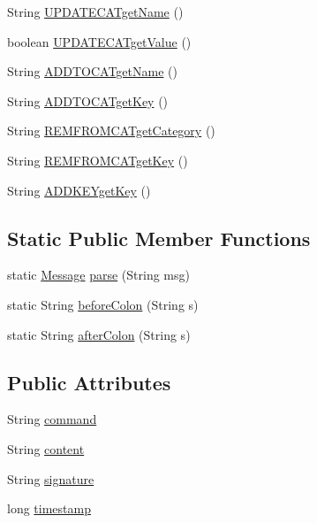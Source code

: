 \begin{DoxyCompactItemize}
\item 
String \hyperlink{classballmerpeak_1_1turtlenet_1_1shared_1_1Message_a4e1c7c11699f6a34f462b9681c77da38}{U\-P\-D\-A\-T\-E\-C\-A\-Tget\-Name} ()
\item 
boolean \hyperlink{classballmerpeak_1_1turtlenet_1_1shared_1_1Message_a3ed9388192f3e9951a35e51b6f127b00}{U\-P\-D\-A\-T\-E\-C\-A\-Tget\-Value} ()
\item 
String \hyperlink{classballmerpeak_1_1turtlenet_1_1shared_1_1Message_a1a2daa84f1872a2eae2d5546c33a77a2}{A\-D\-D\-T\-O\-C\-A\-Tget\-Name} ()
\item 
String \hyperlink{classballmerpeak_1_1turtlenet_1_1shared_1_1Message_ae23107194408d72c962fdda375d15631}{A\-D\-D\-T\-O\-C\-A\-Tget\-Key} ()
\item 
String \hyperlink{classballmerpeak_1_1turtlenet_1_1shared_1_1Message_a4246998ff358cef75ab8d500cdbf59e5}{R\-E\-M\-F\-R\-O\-M\-C\-A\-Tget\-Category} ()
\item 
String \hyperlink{classballmerpeak_1_1turtlenet_1_1shared_1_1Message_a77527087a8adfe105a8d65e0ad6d341d}{R\-E\-M\-F\-R\-O\-M\-C\-A\-Tget\-Key} ()
\item 
String \hyperlink{classballmerpeak_1_1turtlenet_1_1shared_1_1Message_ac16d91309a7a94999c7626737a86db63}{A\-D\-D\-K\-E\-Yget\-Key} ()
\end{DoxyCompactItemize}
\subsection*{Static Public Member Functions}
\begin{DoxyCompactItemize}
\item 
static \hyperlink{classballmerpeak_1_1turtlenet_1_1shared_1_1Message}{Message} \hyperlink{classballmerpeak_1_1turtlenet_1_1shared_1_1Message_a6f88e1021ee9943badeeffd2ecf32262}{parse} (String msg)
\item 
static String \hyperlink{classballmerpeak_1_1turtlenet_1_1shared_1_1Message_add3d57b933d713634ffc42d4757c18dd}{before\-Colon} (String s)
\item 
static String \hyperlink{classballmerpeak_1_1turtlenet_1_1shared_1_1Message_a51657a4b0fa0fe8080a6d9db779c2767}{after\-Colon} (String s)
\end{DoxyCompactItemize}
\subsection*{Public Attributes}
\begin{DoxyCompactItemize}
\item 
String \hyperlink{classballmerpeak_1_1turtlenet_1_1shared_1_1Message_a6057d3c8ba04010edfb343203176645d}{command}
\item 
String \hyperlink{classballmerpeak_1_1turtlenet_1_1shared_1_1Message_a88b89de79f9fec571a22623688697de9}{content}
\item 
String \hyperlink{classballmerpeak_1_1turtlenet_1_1shared_1_1Message_a71a41cba8610df3d655b4b417a0361bc}{signature}
\item 
long \hyperlink{classballmerpeak_1_1turtlenet_1_1shared_1_1Message_acc5644d2bce101cdcc576cb1b87cdf70}{timestamp}
\end{DoxyCompactItemize}



